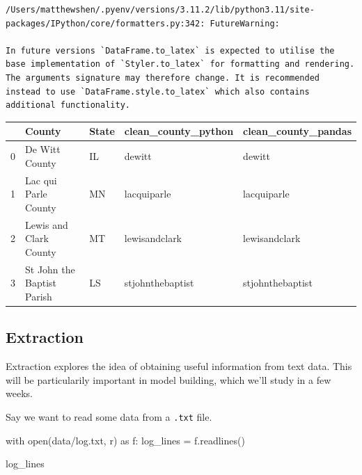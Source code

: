 \documentclass[
  letterpaper,
  DIV=11,
  numbers=noendperiod]{scrreprt}
\newenvironment{Shaded}{\begin{snugshade}}{\end{snugshade}}
\newcommand{\BuiltInTok}[1]{\textcolor[rgb]{0.00,0.23,0.31}{#1}}
\newcommand{\ControlFlowTok}[1]{\textcolor[rgb]{0.00,0.23,0.31}{#1}}
\newcommand{\ImportTok}[1]{\textcolor[rgb]{0.00,0.46,0.62}{#1}}
\newcommand{\NormalTok}[1]{\textcolor[rgb]{0.00,0.23,0.31}{#1}}
\newcommand{\OperatorTok}[1]{\textcolor[rgb]{0.37,0.37,0.37}{#1}}
\newcommand{\StringTok}[1]{\textcolor[rgb]{0.13,0.47,0.30}{#1}}
\begin{document}
\begin{verbatim}
/Users/matthewshen/.pyenv/versions/3.11.2/lib/python3.11/site-packages/IPython/core/formatters.py:342: FutureWarning:

In future versions `DataFrame.to_latex` is expected to utilise the base implementation of `Styler.to_latex` for formatting and rendering. The arguments signature may therefore change. It is recommended instead to use `DataFrame.style.to_latex` which also contains additional functionality.
\end{verbatim}

\begin{tabular}{lllll}
\toprule
{} &                      County & State & clean\_county\_python & clean\_county\_pandas \\
\midrule
0 &              De Witt County &    IL &              dewitt &              dewitt \\
1 &        Lac qui Parle County &    MN &         lacquiparle &         lacquiparle \\
2 &      Lewis and Clark County &    MT &       lewisandclark &       lewisandclark \\
3 &  St John the Baptist Parish &    LS &    stjohnthebaptist &    stjohnthebaptist \\
\bottomrule
\end{tabular}

\hypertarget{extraction}{%
\subsection{Extraction}\label{extraction}}

Extraction explores the idea of obtaining useful information from text
data. This will be particularily important in model building, which
we'll study in a few weeks.

Say we want to read some data from a \texttt{.txt} file.

\begin{Shaded}
\begin{Highlighting}[]
\ControlFlowTok{with} \BuiltInTok{open}\NormalTok{(}\StringTok{\textquotesingle{}data/log.txt\textquotesingle{}}\NormalTok{, }\StringTok{\textquotesingle{}r\textquotesingle{}}\NormalTok{) }\ImportTok{as}\NormalTok{ f:}
\NormalTok{    log\_lines }\OperatorTok{=}\NormalTok{ f.readlines()}
\end{Highlighting}
\end{Shaded}

\begin{Shaded}
\begin{Highlighting}[]
\NormalTok{log\_lines}
\end{Highlighting}
\end{Shaded}
\end{document}
